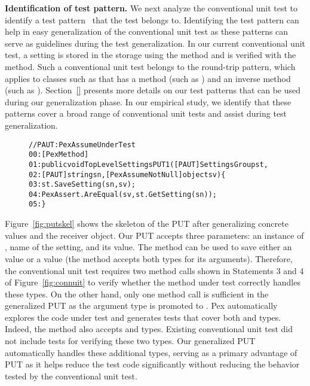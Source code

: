 \textbf{Identification of test pattern.} We next analyze the conventional unit test to identify a test pattern~\cite{PEXDOC} that the test belongs to. Identifying the test pattern can help in easy generalization of the conventional unit test as these patterns can serve as guidelines during the test generalization. In our current conventional unit test, a setting is stored in the storage using the  method and is verified with the  method. Such a conventional unit test belongs to the round-trip pattern, which applies to classes such as  that has a method (such as ) and an inverse method (such as ). Section~\ref{} presents more details on our test patterns that can be used during our generalization phase. In our empirical study, we identify that these patterns cover a broad range of conventional unit tests and assist during test generalization.

\begin{figure}[t]
\begin{CodeOut}
\begin{alltt}
//PAUT: PexAssumeUnderTest
00:[PexMethod]
01:public void TopLevelSettingsPUT1([PAUT] SettingsGroup st, 
02:\hspace*{0.1in}[PAUT] string sn, [PexAssumeNotNull] object sv) \{
03:\hspace*{0.2in}st.SaveSetting(sn, sv);
04:\hspace*{0.2in}PexAssert.AreEqual(sv, st.GetSetting(sn));
05:\}
\end{alltt}
\end{CodeOut}
\end{figure}

Figure~\ref{fig:putskel} shows the skeleton of the PUT after generalizing concrete values and the receiver object. Our PUT accepts three parameters: an instance of , name of the setting, and its value. The  method can be used to save either an  value or a  value (the method accepts both types for its arguments). Therefore, the conventional unit test requires two method calls shown in Statements 3 and 4 of Figure~\ref{fig:connuit} to verify whether the method under test correctly handles these types. On the other hand, only one method call is sufficient in the generalized PUT as the argument type is promoted to . Pex automatically explores the code under test and generates tests that cover both  and  types. Indeed, the  method also accepts  and  types. Existing conventional unit test did not include tests for verifying these two types. Our generalized PUT automatically handles these additional types, serving as a primary advantage of PUT as it helps reduce the test code significantly without reducing the behavior tested by the conventional unit test.

